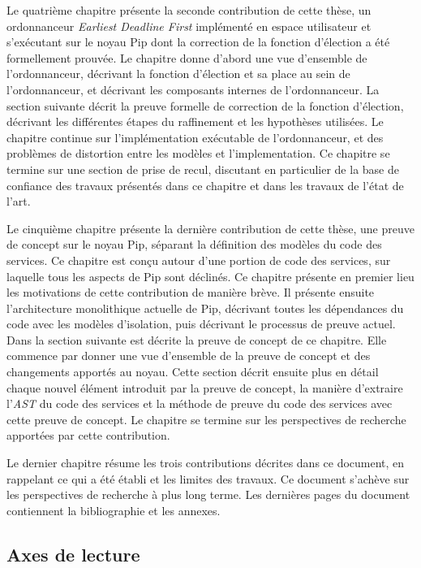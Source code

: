 Le quatrième chapitre présente la seconde contribution de cette thèse, un ordonnanceur \emph{Earliest Deadline First} implémenté en espace utilisateur et s'exécutant sur le noyau Pip dont la correction de la fonction d'élection a été formellement prouvée. Le chapitre donne d'abord une vue d'ensemble de l'ordonnanceur, décrivant la fonction d'élection et sa place au sein de l'ordonnanceur, et décrivant les composants internes de l'ordonnanceur. La section suivante décrit la preuve formelle de correction de la fonction d'élection, décrivant les différentes étapes du raffinement et les hypothèses utilisées. Le chapitre continue sur l'implémentation exécutable de l'ordonnanceur, et des problèmes de distortion entre les modèles et l'implementation. Ce chapitre se termine sur une section de prise de recul, discutant en particulier de la base de confiance des travaux présentés dans ce chapitre et dans les travaux de l'état de l'art.

Le cinquième chapitre présente la dernière contribution de cette thèse, une preuve de concept sur le noyau Pip, séparant la définition des modèles du code des services. Ce chapitre est conçu autour d'une portion de code des services, sur laquelle tous les aspects de Pip sont déclinés. Ce chapitre présente en premier lieu les motivations de cette contribution de manière brève. Il présente ensuite l'architecture monolithique actuelle de Pip, décrivant toutes les dépendances du code avec les modèles d'isolation, puis décrivant le processus de preuve actuel. Dans la section suivante est décrite la preuve de concept de ce chapitre. Elle commence par donner une vue d'ensemble de la preuve de concept et des changements apportés au noyau. Cette section décrit ensuite plus en détail chaque nouvel élément introduit par la preuve de concept, la manière d'extraire l'\emph{AST} du code des services et la méthode de preuve du code des services avec cette preuve de concept. Le chapitre se termine sur les perspectives de recherche apportées par cette contribution.

Le dernier chapitre résume les trois contributions décrites dans ce document, en rappelant ce qui a été établi et les limites des travaux. Ce document s'achève sur les perspectives de recherche à plus long terme. Les dernières pages du document contiennent la bibliographie et les annexes.

\subsection{Axes de lecture}

